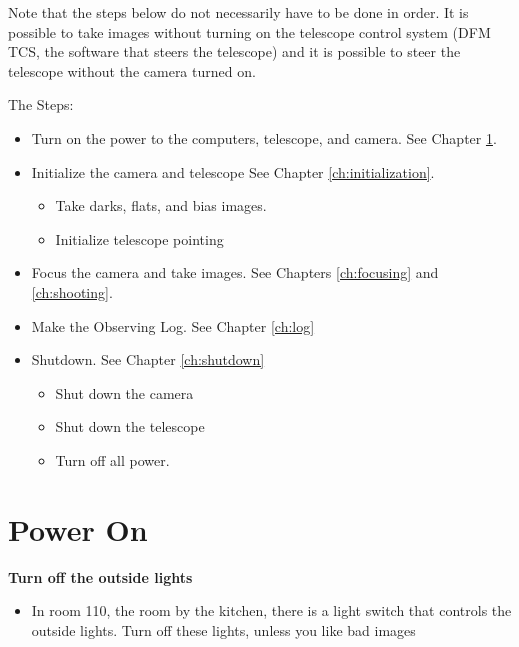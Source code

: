 \documentclass[letterpaper, 12pt]{report}
\begin{document}
Note that the steps below do not necessarily have to be done in order. It is possible to take images without turning on the telescope control system (DFM TCS, the software that steers the telescope) and it is possible to steer the telescope without the camera turned on.

The Steps:
\begin{itemize}
	\item Turn on the power to the computers, telescope, and camera. See Chapter \ref{ch:power}.
	\item Initialize the camera and telescope See Chapter \ref{ch:initialization}.
	\begin{itemize}
		\item Take darks, flats, and bias images.
		\item Initialize telescope pointing
	\end{itemize}
	\item Focus the camera and take images. See Chapters \ref{ch:focusing} and \ref{ch:shooting}.
	\item Make the Observing Log. See Chapter \ref{ch:log}
	\item Shutdown. See Chapter \ref{ch:shutdown}
	\begin{itemize}
		\item Shut down the camera
		\item Shut down the telescope
		\item Turn off all power.
	\end{itemize}
\end{itemize}

\newpage

\chapter{Power On}\label{ch:power}

\textbf{Turn off the outside lights}
\begin{itemize}
	\item In room 110, the room by the kitchen, there is a light switch that controls the outside lights. Turn off these lights, unless you like bad images
\end{itemize}
\end{document}
